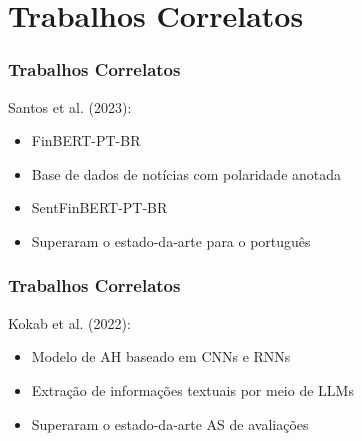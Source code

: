 \section{Trabalhos Correlatos} %


\begin{frame}
	\frametitle{Trabalhos Correlatos}
    Santos et al. (2023):
    \begin{itemize}
        \item FinBERT-PT-BR
        \item Base de dados de notícias com polaridade anotada
        \item SentFinBERT-PT-BR
        \item Superaram o estado-da-arte para o português
    \end{itemize}
	
\end{frame}


\begin{frame}
	\frametitle{Trabalhos Correlatos}
    Kokab et al. (2022):
    \begin{itemize}
        \item Modelo de AH baseado em CNNs e RNNs
        \item Extração de informações textuais por meio de LLMs
        \item Superaram o estado-da-arte AS de avaliações
    \end{itemize}
	
\end{frame}

